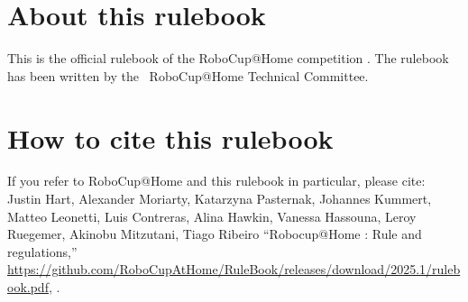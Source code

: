 
\section*{About this rulebook}
This is the official rulebook of the RoboCup@Home competition \YEAR. 
The rulebook has been written by the \YEAR ~RoboCup@Home Technical Committee.

\section*{How to cite this rulebook}
If you refer to RoboCup@Home and this rulebook in particular, please cite:\\

\noindent Justin Hart, Alexander Moriarty, Katarzyna Pasternak, Johannes Kummert, Matteo Leonetti, Luis Contreras,
Alina Hawkin, Vanessa Hassouna, Leroy Ruegemer, Akinobu Mitzutani, Tiago Ribeiro
\enquote{Robocup@Home \YEAR: Rule and regulations,}
\url{https://github.com/RoboCupAtHome/RuleBook/releases/download/2025.1/rulebook.pdf}, \YEAR.

\begin{center}
	\begin{minipage}{0.8\textwidth}
		\footnotesize%
		
	\end{minipage}
\end{center}

\pagebreak